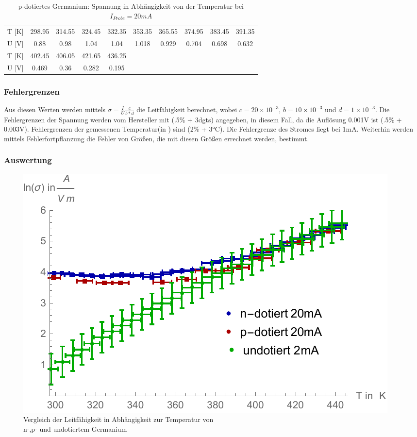 \begin{table}[H]
\centering
\begin{tabular}{|c||c|c|c|c|c|c|c|c|c|}
\hline
T [K] & 298.95 & 314.55 & 324.45 & 332.35 & 353.35 & 365.55 & 374.95 & 383.45 & 391.35 \\
 U [V] & 0.88 & 0.98 & 1.04 & 1.04 & 1.018 & 0.929 & 0.704 & 0.698 & 0.632 \\
 \hline
 T [K]& 402.45
   & 406.05 & 421.65 & 436.25 & & & & & \\
U [V] & 0.469 & 0.36 & 0.282
   & 0.195 & & & & & \\
 \hline
\end{tabular}
\caption{p-dotiertes Germanium: Spannung in Abhängigkeit von der Temperatur bei $I_{Probe}=20mA$}
\end{table} 

\subsubsection{Fehlergrenzen}
Aus diesen Werten werden mittels $\sigma=\frac{I}{U}\frac{c}{b *d}$ die Leitfähigkeit berechnet, wobei $c=20 \times 10^{-3}$, $b=10 \times 10^{-3}$ und $d=1 \times 10^{-3}$. Die Fehlergrenzen der Spannung werden vom Hersteller mit (.5\% + 3dgts) angegeben, in diesem Fall, da die Auflösung 0.001V ist (.5\% + 0.003V). Fehlergrenzen der gemessenen Temperatur(in \celsius) sind (2\% + 3°C). Die Fehlergrenze des Stromes liegt bei 1mA. Weiterhin werden mittels Fehlerfortpflanzung die Fehler von Größen, die mit diesen Größen errechnet werden, bestimmt.\\

\subsubsection{Auswertung}
\begin{figure}[H]
	\centering
\includegraphics[width=0.9\linewidth]{IMAGE/M2_all.pdf}
	\caption{Vergleich der Leitfähigkeit in Abhängigkeit zur Temperatur von\\ n-,p- und undotiertem Germanium}
	\label{fig:M2_1}
\end{figure} 

